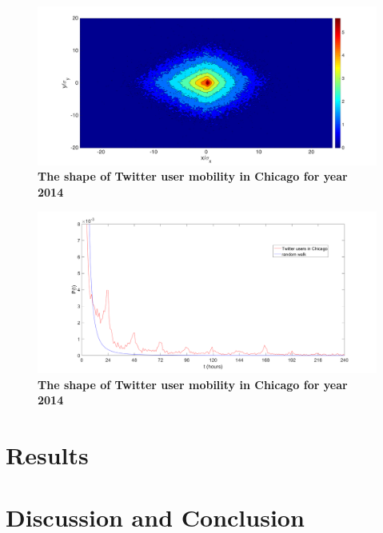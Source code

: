 \documentclass[a4paper,11pt]{article}
\begin{document}
\begin{figure}[ht]
	\includegraphics[width=1.0\linewidth]{./figure/Chicago_Shape}
	\caption{{\bf The shape of Twitter user mobility in Chicago for year 2014}}
	\label{Fig_shape}
\end{figure}

\begin{figure}[ht]
	\includegraphics[width=1.0\linewidth]{./figure/firsttime}
	\caption{{\bf The shape of Twitter user mobility in Chicago for year 2014}}
	\label{Fig_shape}
\end{figure}




\section*{Results}

\section*{Discussion and Conclusion}
\end{document}

